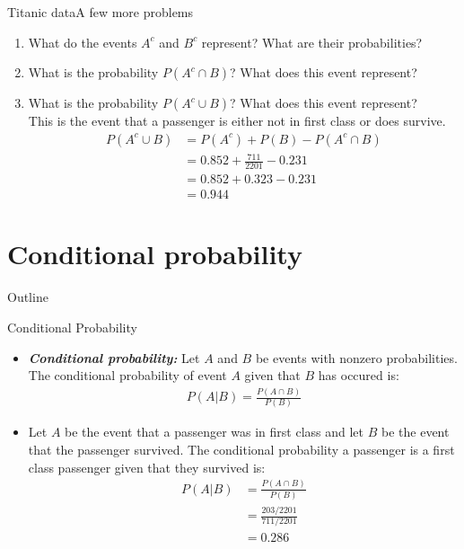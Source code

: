 \documentclass[xcolor=dvipsnames]{beamer}
\begin{document}
\begin{frame}{Titanic data}{A few more problems}
\begin{enumerate}
	\item What do the events $A^c$ and $B^c$ represent? What are their probabilities?
	\item What is the probability $P(A^c \cap B)$? What does this event represent? 
	\item What is the probability $P(A^c \cup B)$? What does this event represent? \\
	This is the event that a passenger is either not in first class or does survive.
	\begin{align*}
		P(A^c \cup B) &= P(A^c) + P(B) - P(A^c \cap B)\\ 
		&= 0.852 + \frac{711}{2201} - 0.231 \\
		&= 0.852 + 0.323 - 0.231 \\
		&= 0.944
	\end{align*}
\end{enumerate}
\end{frame}

\section{Conditional probability}
\begin{frame}{Outline}
\tableofcontents[currentsection,subsectionstyle=show/shaded/hide]
\end{frame}

\begin{frame}{Conditional Probability}
	\begin{itemize}
		\item \textbf{\emph{Conditional probability:}} Let $A$ and $B$ be events with nonzero probabilities. The conditional probability of event $A$ given that $B$ has occured is:
		\begin{gather*}
		P(A|B) = \frac{P(A \cap B)}{P(B)}
		\end{gather*}
		\item Let $A$ be the event that a passenger was in first class and let $B$ be the event that the passenger survived. The conditional probability a passenger is a first class passenger given that they survived is:
		\begin{align*}
		P(A|B) &= \frac{P(A \cap B)}{P(B)} \\
		&=\frac{203 / 2201}{711 / 2201}\\ 
		&= 0.286
		\end{align*}
	\end{itemize}
\end{frame}
\end{document}
